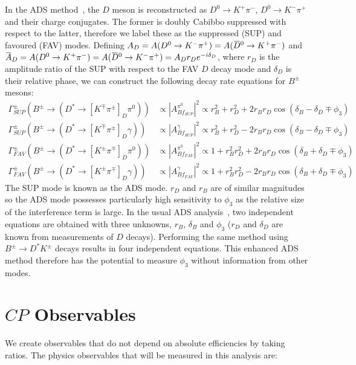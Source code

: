 \documentclass[oneside,12pt]{article}
\newcommand{\overbar}[1]{\mkern 1.5mu\overline{\mkern-1.5mu#1\mkern-1.5mu}\mkern
1.5mu}
\begin{document}
In the ADS method~\cite{ADSRef}, the $D$ meson is reconstructed as
$D^{0}\rightarrow K^{+}\pi^{-}$, $D^{0}\rightarrow K^{-}\pi^{+}$ and their
charge conjugates. The former is doubly Cabibbo suppressed with respect to the
latter, therefore we label these as the suppressed (SUP) and favoured (FAV)
modes. Defining $A_{D}=A(D^{0}\rightarrow
K^{-}\pi^{+})=A(\overbar{D}^{0}\rightarrow K^{+}\pi^{-})$ and $\overbar{A}_{D}=
A(D^{0}\rightarrow K^{+}\pi^{-})=A(\overbar{D}^{0}\rightarrow
K^{-}\pi^{+})=A_{D}r_{D}e^{-i\delta_{D}}$, where $r_{D}$ is the amplitude ratio
of the SUP with respect to the FAV $D$ decay mode and $\delta_{D}$ is their
relative phase, we can construct the following decay rate equations for
$B^{\pm}$ mesons:
\begin{align*}
  \Gamma_{SUP}^{\pm}(B^{\pm}\rightarrow (D^{*}\rightarrow
  [K^{\mp}\pi^{\pm}]_D\pi^{0})) &\propto |A^{\pi^0}_{Bf_{SUP}}|^2 \propto r_{B}^{2}
  + r_{D}^{2} + 2r_{B}r_{D}\cos(\delta_{B} - \delta_{D} \mp \phi_{3}) \\
  \Gamma_{SUP}^{\pm}(B^{\pm}\rightarrow (D^{*}\rightarrow
  [K^{\mp}\pi^{\pm}]_D\gamma)) &\propto |A^{\gamma}_{Bf_{SUP}}|^2 \propto r_{B}^{2}
  + r_{D}^{2} - 2r_{B}r_{D}\cos(\delta_{B} - \delta_{D} \mp \phi_{3}) \\
  \Gamma_{FAV}^{\pm}(B^{\pm}\rightarrow (D^{*}\rightarrow
  [K^{\pm}\pi^{\mp}]_D\pi^{0})) &\propto |A^{\pi^0}_{Bf_{FAV}}|^2 \propto 1 +
  r_{B}^{2}r_{D}^{2} + 2r_{B}r_{D}\cos(\delta_{B} + \delta_{D} \mp \phi_{3}) \\
  \Gamma_{FAV}^{\pm}(B^{\pm}\rightarrow (D^{*}\rightarrow
  [K^{\pm}\pi^{\mp}]_D\gamma)) &\propto |A^{\gamma}_{Bf_{FAV}}|^2 \propto 1 +
  r_{B}^{2}r_{D}^{2} - 2r_{B}r_{D}\cos(\delta_{B} + \delta_{D} \mp \phi_{3})
\end{align*}
\noindent The SUP mode is known as the ADS mode. $r_{D}$ and $r_{B}$ are of
similar magnitudes so the ADS mode possesses particularly high sensitivity to
$\phi_3$ as the relative size of the interference term is large. In the usual
ADS analysis~\cite{ADSRef}, two independent equations are obtained with three
unknowns, $r_B$, $\delta_B$ and $\phi_3$ ($r_{D}$ and $\delta_D$ are known from
measurements of $D$ decays). Performing the same method using
$B^{\pm}\rightarrow D^{*}K^{\pm}$ decays results in four independent equations. This
enhanced ADS method therefore has the potential to measure $\phi_3$ without
information from other modes.

\vspace{-3mm}
\section{\normalsize $CP$ Observables} \label{sec:observables}
We create observables that do not depend on absolute efficiencies by taking
ratios. The physics observables that will be measured in this analysis are:
\end{document}
